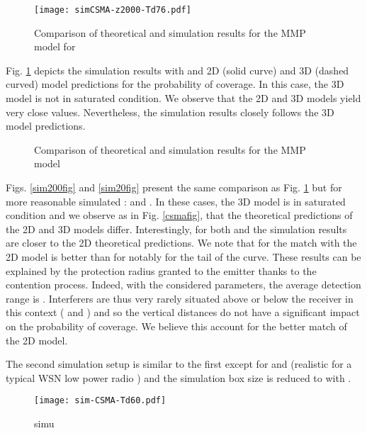 \documentclass{sig-alternate-05-2015}
\begin{document}
\begin{figure}[ht]
  \centering
  \texttt{[image: simCSMA-z2000-Td76.pdf]}
  \caption{Comparison of theoretical and simulation results for the MMP model for }
  \label{sim2000fig}
\end{figure}

Fig. \ref{sim2000fig} depicts the simulation results  with  and 2D (solid curve) and 3D (dashed curved) model predictions for the probability of coverage. In this case, the 3D model is not in saturated condition. We observe that the 2D and 3D models yield very close values. Nevertheless, the simulation results closely follows the 3D model predictions.

\begin{figure*}[ht]
        \centering

        \caption{Comparison of theoretical and simulation results for the MMP model}
\end{figure*}

Figs. \ref{sim200fig} and \ref{sim20fig} present the same comparison as Fig. \ref{sim2000fig} but for more reasonable simulated :  and . In these cases, the 3D model is in saturated condition and we observe as in Fig. \ref{csmafig}, that the theoretical predictions of the 2D and 3D models differ. Interestingly, for both  and  the simulation results are closer to the 2D theoretical predictions. We note that for  the match with the 2D model is better than for  notably for the tail of the curve. These results can be explained by the protection radius granted to the emitter thanks to the contention process. Indeed, with the considered parameters, the average detection range is . Interferers are thus very rarely situated above or below the receiver in this context ( and ) and so the vertical distances do not have a significant impact on the probability of coverage. We believe this account for the better match of the 2D model.

The second simulation setup is similar to the first except for  and  (realistic for a typical WSN low power radio \cite{cc1100}) and the simulation box size is reduced to  with .

\begin{figure}[ht]
  \centering
  \texttt{[image: sim-CSMA-Td60.pdf]}
  \caption{simu}
  \label{sim2Td60fig}
\end{figure}
\end{document}
